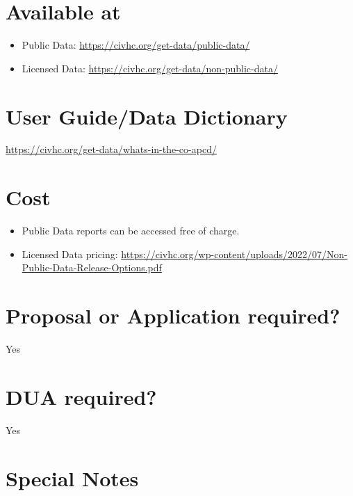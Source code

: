 \documentclass[
]{book}
\providecommand{\tightlist}{%
  \setlength{\itemsep}{0pt}\setlength{\parskip}{0pt}}
\begin{document}
\hypertarget{available-at-16}{%
\section{Available at}\label{available-at-16}}

\begin{itemize}
\tightlist
\item
  Public Data: \url{https://civhc.org/get-data/public-data/}
\item
  Licensed Data: \url{https://civhc.org/get-data/non-public-data/}
\end{itemize}

\hypertarget{user-guidedata-dictionary-16}{%
\section{User Guide/Data Dictionary}\label{user-guidedata-dictionary-16}}

\url{https://civhc.org/get-data/whats-in-the-co-apcd/}

\hypertarget{cost-16}{%
\section{Cost}\label{cost-16}}

\begin{itemize}
\tightlist
\item
  Public Data reports can be accessed free of charge.
\item
  Licensed Data pricing: \url{https://civhc.org/wp-content/uploads/2022/07/Non-Public-Data-Release-Options.pdf}
\end{itemize}

\hypertarget{proposal-or-application-required-16}{%
\section{Proposal or Application required?}\label{proposal-or-application-required-16}}

Yes

\hypertarget{dua-required-16}{%
\section{DUA required?}\label{dua-required-16}}

Yes

\hypertarget{special-notes-16}{%
\section{Special Notes}\label{special-notes-16}}
\end{document}
